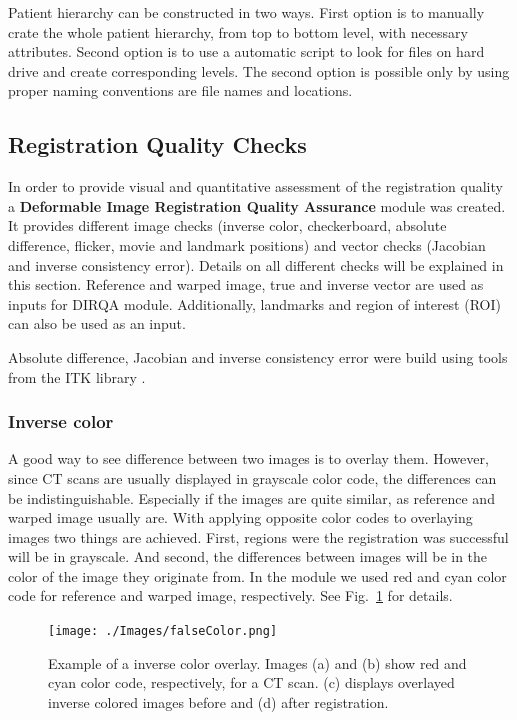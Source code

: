 \documentclass[type=dr, dr=rernat, accentcolor=tud7b,colorbacktitle, bigchapter, openright, twoside, 12pt ]{tudthesis}
\begin{document}
Patient hierarchy can be constructed in two ways. First option is to manually crate the whole patient hierarchy, from top to bottom level, with necessary attributes. Second option is to use a automatic script to look 
for files on hard drive and create corresponding levels. The second option is possible only by using proper naming conventions are file names and locations.

\subsection{Registration Quality Checks}
\label{DIRQA}

In order to provide visual and quantitative assessment of the registration quality a \textbf{Deformable Image Registration Quality Assurance} module was created. It provides different image checks (inverse color, checkerboard, absolute difference, flicker, movie and landmark positions) and vector checks (Jacobian and inverse consistency error). Details on all different checks will be explained in this section. Reference and warped image, true and inverse vector are used as inputs for DIRQA module. Additionally, landmarks and region of interest (ROI) can also be used as an input.

Absolute difference, Jacobian and inverse consistency error were build using tools from the ITK library \cite{Yoo2002}.

\subsubsection{Inverse color}
\label{Sec:FalseColor}

A good way to see difference between two images is to overlay them. However, since CT scans are usually displayed in grayscale color code, the differences can be indistinguishable. Especially if the images are quite similar, as reference and warped image usually are. With applying opposite color codes to overlaying images two things are achieved. First, regions were the registration was successful will be in grayscale. And second, the differences between images will be in the color of the image they originate from. In the module we used red and cyan color code for reference and warped image, respectively. See Fig.~\ref{falseColor} for details.

\begin{figure}[H]
	\begin{center}		
		\texttt{[image: ./Images/falseColor.png]}
		\caption{Example of a inverse color overlay. Images (a) and (b) show red and cyan color code, respectively, for a CT scan. (c) displays overlayed inverse colored images before and (d) after registration.}
		\label{falseColor}
	\end{center}
\end{figure}
\end{document}
